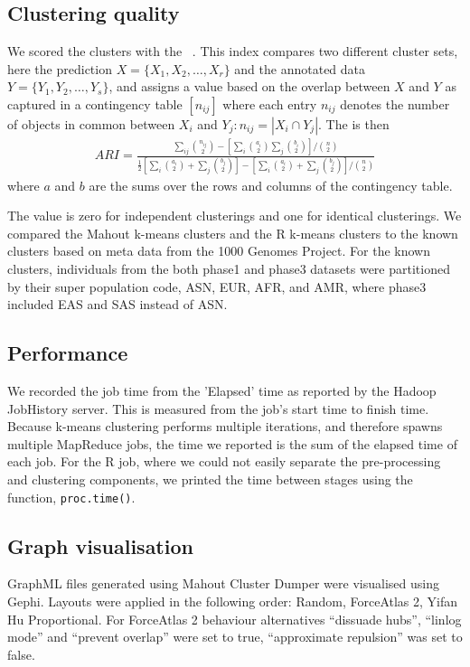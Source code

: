 \documentclass{bioinfo}
\begin{document}
\begin{methods}
\subsection*{Clustering quality}
We scored the clusters with the \ARI{}~\citep{Hubert1985}. 
This index compares two different cluster sets, here the prediction $X = \{ X_1, X_2, \ldots , X_r \}$ and the annotated data $Y = \{ Y_1, Y_2, \ldots , Y_s \}$, and assigns a value based on the overlap between $X$ and $Y$ as captured in a contingency table $\left[n_{ij}\right]$ where each entry $n_{ij}$ denotes the number of objects in common between $X_i$ and $Y_j : n_{ij}=|X_i \cap Y_j|$. 
The \ARI{} is then 
{\tiny
\begin{eqnarray*}
ARI=\frac{\sum_{ij}{{n_{ij}\choose 2}} - \left[ \sum_{i}{{a_i\choose2}} \sum_{j}{{b_i\choose2}} \right] / {n\choose2}}{\frac{1}{2} \left[ \sum_{i}{{a_{i}\choose 2} + \sum_{j}{{b_{j}\choose 2}}} \right] - \left[ \sum_{i}{{a_{i}\choose 2} + \sum_{j}{{b_{j}\choose 2}}} \right] / {n\choose2}} 
\end{eqnarray*}
}
where $a$ and $b$ are the sums over the rows and columns of the contingency table.

The value is zero for independent clusterings and one for identical clusterings. 
We compared the Mahout k-means clusters and the R k-means clusters to the known clusters based on meta data from the 1000 Genomes Project.
For the known clusters, individuals from the both phase1 and phase3 datasets were partitioned by their super population code, ASN, EUR, AFR, and AMR, where phase3 included EAS and SAS instead of ASN.



\subsection*{Performance}
We recorded the job time from the 'Elapsed' time as reported by the Hadoop JobHistory server. This is measured from the job's start time to finish time.
Because k-means clustering performs multiple iterations, and therefore spawns multiple MapReduce jobs, the time we reported is the sum of the elapsed time of each job.
For the R job, where we could not easily separate the pre-processing and clustering components, we printed the time between
stages using the function, \texttt{proc.time()}.


\subsection*{Graph visualisation}
GraphML files generated using Mahout Cluster Dumper were visualised using Gephi. Layouts were applied in the following order: Random, ForceAtlas 2, Yifan Hu Proportional.
For ForceAtlas 2 behaviour alternatives ``dissuade hubs'', ``linlog mode'' and ``prevent overlap'' were set to true, ``approximate repulsion'' was set to false.


\end{methods}
\end{document}
